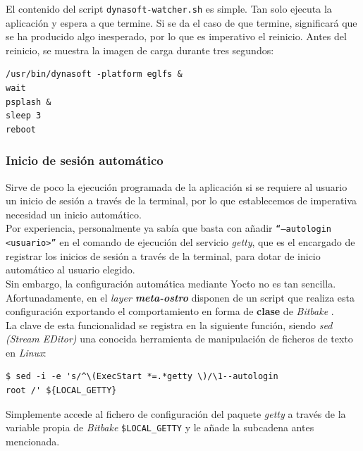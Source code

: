 El contenido del script \texttt{dynasoft-watcher.sh} es simple. Tan solo ejecuta la aplicación y espera a que termine. Si se da el caso de que termine, significará que se ha producido algo inesperado, por lo que es imperativo el reinicio. Antes del reinicio, se muestra la imagen de carga durante tres segundos:\\

\begin{lstlisting}
/usr/bin/dynasoft -platform eglfs &
wait
psplash &
sleep 3
reboot
\end{lstlisting}

\subsubsection{Inicio de sesión automático}

Sirve de poco la ejecución programada de la aplicación si se requiere al usuario un inicio de sesión a través de la terminal, por lo que establecemos de imperativa necesidad un inicio automático.\\

Por experiencia, personalmente ya sabía que basta con añadir \texttt{``--autologin <usuario>''} en el comando de ejecución del servicio \textit{getty}, que es el encargado de registrar los inicios de sesión a través de la terminal, para dotar de inicio automático al usuario elegido.\\

Sin embargo, la configuración automática mediante Yocto no es tan sencilla. Afortunadamente, en el \textit{layer \textbf{meta-ostro}} disponen de un script que realiza esta configuración exportando el comportamiento en forma de \textbf{clase} de \textit{Bitbake} \cite{ostro-image-autologin}.\\

La clave de esta funcionalidad se registra en la siguiente función, siendo \textit{sed (Stream EDitor)} una conocida herramienta de manipulación de ficheros de texto en \textit{Linux}:\\

\begin{lstlisting}
$ sed -i -e 's/^\(ExecStart *=.*getty \)/\1--autologin 
root /' ${LOCAL_GETTY}
\end{lstlisting}

Simplemente accede al fichero de configuración del paquete \textit{getty} a través de la variable propia de \textit{Bitbake} \texttt{\${LOCAL\_GETTY}} y le añade la subcadena antes mencionada.\\

